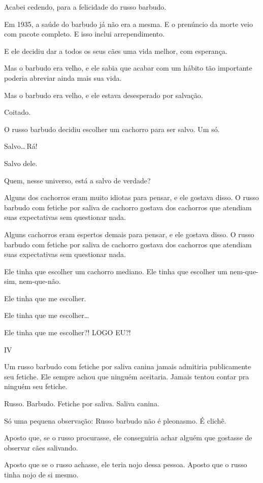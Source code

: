 Acabei cedendo, para a felicidade do russo barbudo.

Em 1935, a saúde do barbudo já não era a mesma. E o prenúncio da morte veio com pacote completo. E isso inclui arrependimento.

E ele decidiu dar a todos os seus cães uma vida melhor, com esperança.

Mas o barbudo era velho, e ele sabia que acabar com um hábito tão importante poderia abreviar ainda mais sua vida.

Mas o barbudo era velho, e ele estava desesperado por salvação.

Coitado.

O russo barbudo decidiu escolher um cachorro para ser salvo. Um só.

Salvo\ldots\,Rá!

Salvo dele.

Quem, nesse universo, está a salvo de verdade?

Alguns dos cachorros eram muito idiotas para pensar, e ele gostava disso. O russo barbudo com fetiche por saliva de cachorro gostava dos cachorros que atendiam suas expectativas sem questionar nada.

Alguns cachorros eram espertos demais para pensar, e ele gostava disso. O russo barbudo com fetiche por saliva de cachorro gostava dos cachorros que atendiam suas expectativas sem questionar nada.

Ele tinha que escolher um cachorro mediano. Ele tinha que escolher um nem-que-sim, nem-que-não.

Ele tinha que me escolher.

Ele tinha que me escolher\ldots

Ele tinha que me escolher?! LOGO EU?!

\newpage
\begin{center}
{\Large IV}
\end{center}

Um russo barbudo com fetiche por saliva canina jamais admitiria publicamente seu fetiche. Ele sempre achou que ninguém aceitaria. Jamais tentou contar pra ninguém seu fetiche.

Russo. Barbudo. Fetiche por saliva. Saliva canina.

Só uma pequena observação: Russo barbudo não é pleonasmo. É clichê.

Aposto que, se o russo procurasse, ele conseguiria achar alguém que gostasse de observar cães salivando.

Aposto que se o russo achasse, ele teria nojo dessa pessoa. Aposto que o russo tinha nojo de si mesmo.

